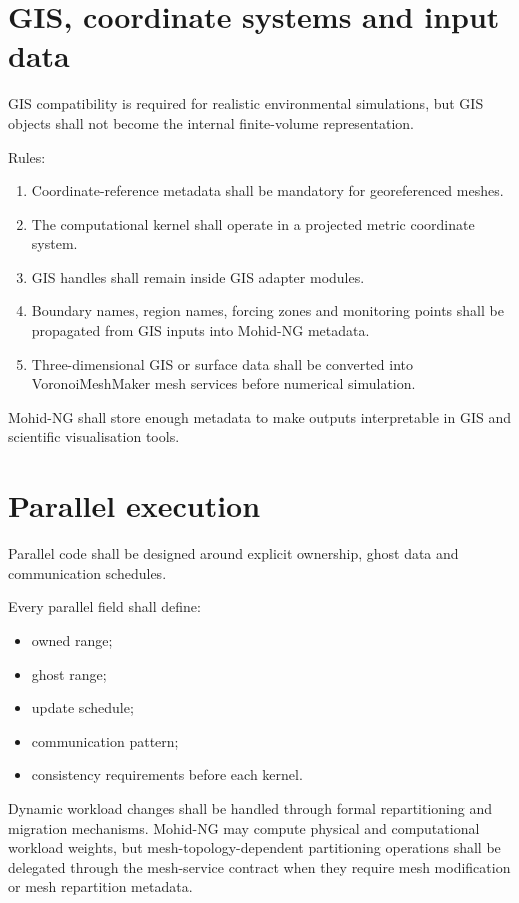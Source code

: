 \documentclass[11pt,a4paper]{article}
\begin{document}
\section{GIS, coordinate systems and input data}

GIS compatibility is required for realistic environmental simulations, but GIS objects shall not become the internal finite-volume representation.

Rules:

\begin{enumerate}
  \item Coordinate-reference metadata shall be mandatory for georeferenced meshes.
  \item The computational kernel shall operate in a projected metric coordinate system.
  \item GIS handles shall remain inside GIS adapter modules.
  \item Boundary names, region names, forcing zones and monitoring points shall be propagated from GIS inputs into Mohid-NG metadata.
  \item Three-dimensional GIS or surface data shall be converted into VoronoiMeshMaker mesh services before numerical simulation.
\end{enumerate}

Mohid-NG shall store enough metadata to make outputs interpretable in GIS and scientific visualisation tools.

\section{Parallel execution}

Parallel code shall be designed around explicit ownership, ghost data and communication schedules.

Every parallel field shall define:

\begin{itemize}
  \item owned range;
  \item ghost range;
  \item update schedule;
  \item communication pattern;
  \item consistency requirements before each kernel.
\end{itemize}

Dynamic workload changes shall be handled through formal repartitioning and migration mechanisms. Mohid-NG may compute physical and computational workload weights, but mesh-topology-dependent partitioning operations shall be delegated through the mesh-service contract when they require mesh modification or mesh repartition metadata.
\end{document}
